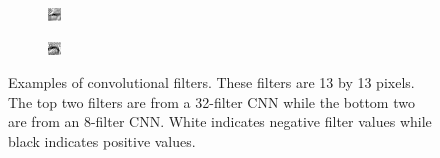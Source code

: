 \documentclass[10pt,twocolumn]{article}
\begin{document}
\begin{figure}
\begin{subfigure}{.23\textwidth}
	\end{subfigure}
	\begin{subfigure}{.23\textwidth}
		\includegraphics[width=\textwidth]{figure/filter3}
	\end{subfigure}
	\begin{subfigure}{.23\textwidth}
		\includegraphics[width=\textwidth]{figure/filter4}
	\end{subfigure}
	\caption{Examples of convolutional filters. These filters are 13 by 13 pixels. The top two filters are from a 32-filter CNN while the bottom two are from an 8-filter CNN. White indicates negative filter values while black indicates positive values.}
	\label{fig:filter}
\end{figure}
\end{document}
